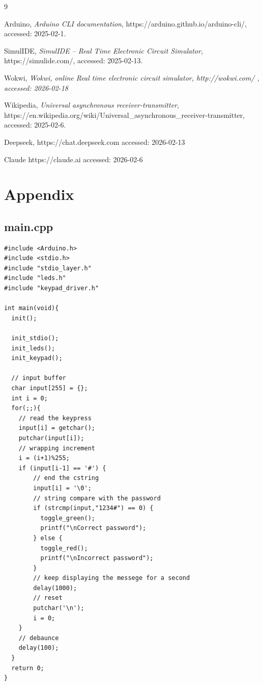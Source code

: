 \documentclass[10pt,a4paper]{report}
\begin{document}
\newpage
\begin{thebibliography}{9} %

Arduino,
\emph{Arduino CLI documentation},
https://arduino.github.io/arduino-cli/,
accessed: 2025-02-1.

SimulIDE,
\emph{SimulIDE – Real Time Electronic Circuit Simulator},
https://simulide.com/,
accessed: 2025-02-13.

Wokwi,
\emph{Wokwi, online Real time electronic circuit simulator, http://wokwi.com/ , accessed: 2026-02-18}

Wikipedia,
\emph{Universal asynchronous receiver-transmitter},
https://en.wikipedia.org/wiki/Universal\_asynchronous\_receiver-transmitter,
accessed: 2025-02-6.

Deepseek, 
https://chat.deepseek.com
accessed: 2026-02-13

Claude
https://claude.ai
accessed: 2026-02-6

\end{thebibliography}

\newpage
\section*{Appendix}

\subsection*{main.cpp}
\begin{lstlisting}
#include <Arduino.h>
#include <stdio.h>
#include "stdio_layer.h"
#include "leds.h"
#include "keypad_driver.h"

int main(void){
  init();
  
  init_stdio();
  init_leds();
  init_keypad();

  // input buffer
  char input[255] = {};
  int i = 0;
  for(;;){
    // read the keypress
    input[i] = getchar();
    putchar(input[i]);
    // wrapping increment
    i = (i+1)%255;
    if (input[i-1] == '#') {
        // end the cstring
        input[i] = '\0';
        // string compare with the password
        if (strcmp(input,"1234#") == 0) {
          toggle_green();
          printf("\nCorrect password");
        } else {
          toggle_red();
          printf("\nIncorrect password");
        }
        // keep displaying the messege for a second
        delay(1000);
        // reset
        putchar('\n');
        i = 0;
    }
    // debaunce
    delay(100);
  }
  return 0;
}
\end{lstlisting}
\end{document}
